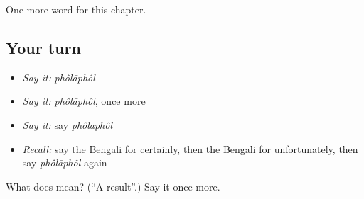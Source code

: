 \begin{grammarlens}[title={What you've built}]
One more word for this chapter.
\end{grammarlens}

\subsection*{Your turn}
\begin{itemize}
\raggedright
  \item \emph{Say it:} \emph{phôlāphôl}
  \item \emph{Say it:} \emph{phôlāphôl}, once more
  \item \emph{Say it:} say \emph{phôlāphôl}
  \item \emph{Recall:} say the Bengali for certainly, then the Bengali for unfortunately, then say \emph{phôlāphôl} again
\end{itemize}

\begin{tcolorbox}[breakable,colback=teal!4,colframe=teal!35!black,title={Before you move on}]
What does  mean? (\textquotedblleft{}A result\textquotedblright{}.) Say it once more.
\end{tcolorbox}
